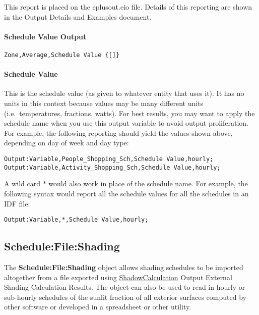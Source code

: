 This report is placed on the eplusout.eio file. Details of this reporting are shown in the Output Details and Examples document.

\paragraph{Schedule Value Output}\label{schedule-value-output}

\begin{lstlisting}
Zone,Average,Schedule Value {[]}
\end{lstlisting}

\paragraph{Schedule Value}\label{schedule-value}

This is the schedule value (as given to whatever entity that uses it). It has no units in this context because values may be many different units (i.e.~temperatures, fractions, watts). For best results, you may want to apply the schedule name when you use this output variable to avoid output proliferation. For example, the following reporting should yield the values shown above, depending on day of week and day type:

\begin{lstlisting}
Output:Variable,People_Shopping_Sch,Schedule Value,hourly;
Output:Variable,Activity_Shopping_Sch,Schedule Value,hourly;
\end{lstlisting}

A wild card $*$ would also work in place of the schedule name. For example, the following syntax would report all the schedule values for all the schedules in an IDF file:
\begin{lstlisting}
Output:Variable,*,Schedule Value,hourly;
\end{lstlisting}

\subsection{Schedule:File:Shading}\label{schedulefileshading}

The \textbf{Schedule:File:Shading} object allows shading schedules to be imported altogether from a file exported using \hyperref[shadowcalculation]{ShadowCalculation} Output External Shading Calculation Results. The object can also be used to read in hourly or sub-hourly schedules of the sunlit fraction of all exterior surfaces computed by other software or developed in a spreadsheet or other utility.

